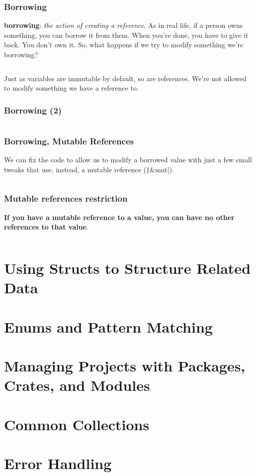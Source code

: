 \documentclass{beamer}
\begin{document}
\begin{frame}[fragile]
	\frametitle{Borrowing}
	\textbf{borrowing}: \textit{the action of creating a reference}.
	As in real life, if a person owns something, you can borrow it from them. When you’re done, you have to give it back. You don’t own it. So, what happens if we try to modify something we’re borrowing?
		\inputminted{rust}{./code/borrowing.rs}
		
		\small
	Just as variables are immutable by default, so are references. We’re not allowed to modify something we have a reference to.
\end{frame}

\begin{frame}[fragile]
	\frametitle{Borrowing (2)}
	\inputminted{shell}{./code/borrowing.shell}
\end{frame}


\begin{frame}[fragile]
	\frametitle{Borrowing, Mutable References}
	We can fix the code to allow us to modify a borrowed value with just a few small tweaks that use, instead, a mutable reference (\texttt|&mut|).
	\inputminted{rust}{./code/borrowing-mut-ref.rs}
\end{frame}


\begin{frame}[fragile]
	\frametitle{Mutable references restriction}
	\textbf{If you have a mutable reference to a value, you can have no other references to that value}. 
	\inputminted{rust}{./code/borrowing-mut-ref-err1.rs}
\end{frame}


\section{Using Structs to Structure Related Data}
\section{Enums and Pattern Matching}
\section{Managing Projects with Packages, Crates, and Modules}
\section{Common Collections}
\section{Error Handling}
\end{document}
